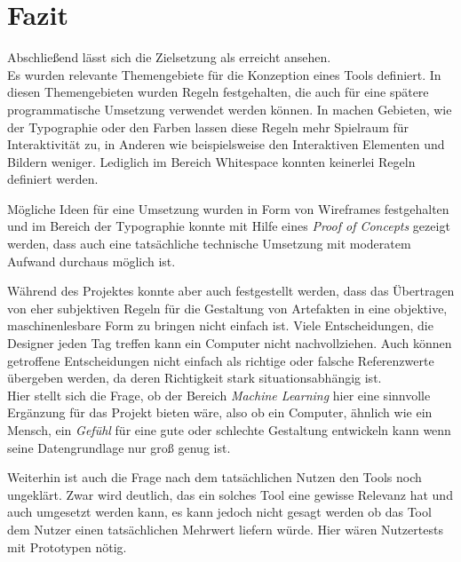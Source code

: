 
\chapter{Fazit} %

\label{Fazit} %


Abschließend lässt sich die Zielsetzung als erreicht ansehen. \\
Es wurden relevante Themengebiete für die Konzeption eines Tools definiert. In diesen Themengebieten wurden Regeln festgehalten, die auch für eine spätere programmatische Umsetzung verwendet werden können. In machen Gebieten, wie der Typographie oder den Farben lassen diese Regeln mehr Spielraum für Interaktivität zu, in Anderen wie beispielsweise den Interaktiven Elementen und Bildern weniger. Lediglich im Bereich Whitespace konnten keinerlei Regeln definiert werden.

Mögliche Ideen für eine Umsetzung wurden in Form von Wireframes festgehalten und im Bereich der Typographie konnte mit Hilfe eines \textit{Proof of Concepts} gezeigt werden, dass auch eine tatsächliche technische Umsetzung mit moderatem Aufwand durchaus möglich ist.

Während des Projektes konnte aber auch festgestellt werden, dass das Übertragen von eher subjektiven Regeln für die Gestaltung von Artefakten in eine objektive, maschinenlesbare Form zu bringen nicht einfach ist. Viele Entscheidungen, die Designer jeden Tag treffen kann ein Computer nicht nachvollziehen. Auch können getroffene Entscheidungen nicht einfach als richtige oder falsche Referenzwerte übergeben werden, da deren Richtigkeit stark situationsabhängig ist. \\
Hier stellt sich die Frage, ob der Bereich \textit{Machine Learning} hier eine sinnvolle Ergänzung für das Projekt bieten wäre, also ob ein Computer, ähnlich wie ein Mensch, ein \textit{Gefühl} für eine gute oder schlechte Gestaltung entwickeln kann wenn seine Datengrundlage nur groß genug ist.

Weiterhin ist auch die Frage nach dem tatsächlichen Nutzen den Tools noch ungeklärt. Zwar wird deutlich, das ein solches Tool eine gewisse Relevanz hat und auch umgesetzt werden kann, es kann jedoch nicht gesagt werden ob das Tool dem Nutzer einen tatsächlichen Mehrwert liefern würde. Hier wären Nutzertests mit Prototypen nötig. 


\clearpage